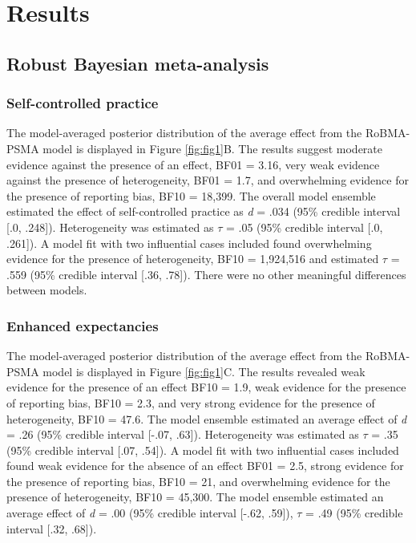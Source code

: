 \documentclass[
  doc, donotrepeattitle,floatsintext]{apa7}
\begin{document}
\hypertarget{results}{%
\section{Results}\label{results}}

\hypertarget{robust-bayesian-meta-analysis-1}{%
\subsection{Robust Bayesian meta-analysis}\label{robust-bayesian-meta-analysis-1}}

\hypertarget{self-controlled-practice}{%
\subsubsection{Self-controlled practice}\label{self-controlled-practice}}

The model-averaged posterior distribution of the average effect from the RoBMA-PSMA model is displayed in Figure \ref{fig:fig1}B. The results suggest moderate evidence against the presence of an effect, BF01 = 3.16, very weak evidence against the presence of heterogeneity, BF01 = 1.7, and overwhelming evidence for the presence of reporting bias, BF10 = 18,399. The overall model ensemble estimated the effect of self-controlled practice as \emph{d} = .034 (95\% credible interval {[}.0, .248{]}). Heterogeneity was estimated as \(\tau\) = .05 (95\% credible interval {[}.0, .261{]}). A model fit with two influential cases included found overwhelming evidence for the presence of heterogeneity, BF10 = 1,924,516 and estimated \(\tau\) = .559 (95\% credible interval {[}.36, .78{]}). There were no other meaningful differences between models.

\hypertarget{enhanced-expectancies}{%
\subsubsection{Enhanced expectancies}\label{enhanced-expectancies}}

The model-averaged posterior distribution of the average effect from the RoBMA-PSMA model is displayed in Figure \ref{fig:fig1}C. The results revealed weak evidence for the presence of an effect BF10 = 1.9, weak evidence for the presence of reporting bias, BF10 = 2.3, and very strong evidence for the presence of heterogeneity, BF10 = 47.6. The model ensemble estimated an average effect of \emph{d} = .26 (95\% credible interval {[}-.07, .63{]}). Heterogeneity was estimated as \(\tau\) = .35 (95\% credible interval {[}.07, .54{]}). A model fit with two influential cases included found weak evidence for the absence of an effect BF01 = 2.5, strong evidence for the presence of reporting bias, BF10 = 21, and overwhelming evidence for the presence of heterogeneity, BF10 = 45,300. The model ensemble estimated an average effect of \emph{d} = .00 (95\% credible interval {[}-.62, .59{]}), \(\tau\) = .49 (95\% credible interval {[}.32, .68{]}).
\end{document}
